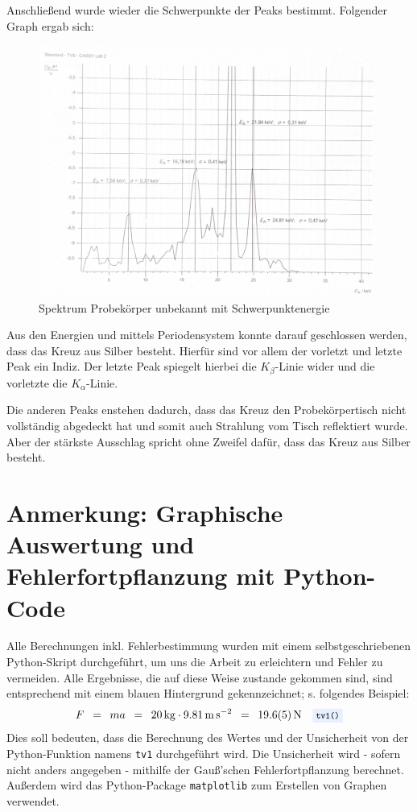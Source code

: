 \documentclass{article}
\newcommand{\widespace}{\enspace}
\newcommand{\wideeq}{\widespace = \widespace}
\newcommand{\coderef}[1]{%
    \text{\footnotesize \colorbox{codebg}{\texttt{#1()}}}%
}
\begin{document}
Anschließend wurde wieder die Schwerpunkte der Peaks bestimmt. Folgender Graph ergab sich:

\begin{figure}[H]
    \centering
    \includegraphics[width=0.7\linewidth]{Abbildungen/TV5mitWerten.png}
    \caption{Spektrum Probekörper unbekannt mit Schwerpunktenergie}
\end{figure}

Aus den Energien und mittels Periodensystem konnte darauf geschlossen werden, dass das Kreuz aus Silber besteht. Hierfür sind vor allem der vorletzt und letzte Peak ein Indiz. Der letzte Peak spiegelt hierbei die $K_\beta$-Linie wider und die vorletzte die $K_\alpha$-Linie.

Die anderen Peaks enstehen dadurch, dass das Kreuz den Probekörpertisch nicht vollständig abgedeckt hat und somit auch Strahlung vom Tisch reflektiert wurde. Aber der stärkste Ausschlag spricht ohne Zweifel dafür, dass das Kreuz aus Silber besteht.

\newpage


\section{Anmerkung: Graphische Auswertung und Fehlerfortpflanzung mit Python-Code}

Alle Berechnungen inkl. Fehlerbestimmung wurden mit einem selbstgeschriebenen
Python-Skript durchgeführt, um uns die Arbeit zu erleichtern und Fehler zu
vermeiden. Alle Ergebnisse, die auf diese Weise zustande gekommen sind,
sind entsprechend mit einem \colorbox{codebg}{blauen Hintergrund} gekennzeichnet;
s. folgendes Beispiel:
\[
    F \wideeq ma \wideeq \qty{20}{\kg} \cdot \qty{9.81}{\meter\per\square\second}
    \wideeq \qty{19.6 \pm 0.5}{\newton} \quad \coderef{tv1}
\]
Dies soll bedeuten, dass die Berechnung des Wertes und der Unsicherheit von der
Python-Funktion namens \verb|tv1| durchgeführt wird.
Die Unsicherheit wird - sofern nicht anders angegeben - mithilfe der Gauß'schen
Fehlerfortpflanzung berechnet.
Außerdem wird das Python-Package \texttt{matplotlib} zum Erstellen
von Graphen verwendet.
\end{document}
